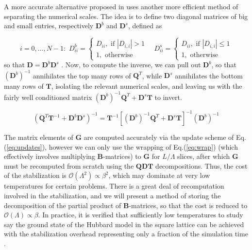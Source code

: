 A more accurate alternative proposed in \cite{bai_stable_2011} uses another more efficient method of separating the numerical scales.
The idea is to define two diagonal matrices of big and small entries, respectively $\bm D^b$ and $\bm D^s$, defined as

\begin{equation}
i = 0,..., N-1 :\,\,
D_{i i}^b =
\begin{cases}
D_{i i} , \,\, \text{if} \,\, | D_{i, i} | > 1 \\
1 , \,\, \text{otherwise}
\end{cases}
\quad
D_{i i}^s =
\begin{cases}
D_{i i} , \,\, \text{if} \,\, | D_{i, i} | \le 1 \\
1 , \,\, \text{otherwise}
\end{cases}
\end{equation}
so that $\bm D = \bm D^b \bm D^s$ .
Now, to compute the inverse, we can pull out $\bm D^b$, so that $(\bm D^b)^{-1}$ annihilates the top many rows of $\bm Q^T$, while $\bm D^s$ annihilates the bottom many rows of $\bm T$, isolating the relevant numerical scales, and leaving us with the fairly well conditioned matrix $(\bm D^b)^{-1} \bm Q^T + \bm D^s \bm T$ to invert.

\begin{equation}
( \bm Q^T \bm T^{-1} + \bm D^b \bm D^s )^{-1} = \bm T^{-1} [ (\bm D^b)^{-1} \bm Q^T + \bm D^s \bm T ]^{-1} (\bm D^b)^{-1}
\end{equation}

The matrix elements of $\bm G$ are computed accurately via the update scheme of Eq.(\ref{eq:updates}), however we can only use the wrapping of Eq.(\ref{eq:wrap}) (which effectively involves multiplying $\bm B$-matrices) to   $\bm G$ for $L / \Lambda$ slices, after which $\bm G$ must be recomputed from scratch using the $\bm Q \bm D \bm T$ decompositions.
Thus, the cost of the stabilization is $\mathcal{O} ( \Lambda^2 ) \propto 
\beta^2$, which may dominate at very low temperatures for certain problems.
There is a great deal of recomputation involved in the stabilization, and we will present a method of storing the decomposition of the partial product of $\bm B$-matrices, so that the cost is reduced to $\mathcal{O}(\Lambda) \propto \beta$.
In practice, it is verified that sufficiently low temperatures to study say the ground state of the Hubbard model in the square lattice can be achieved with the stabilization overhead representing only a fraction of the simulation time \cite{hanke_electronic_nodate,white_numerical_1989}.

